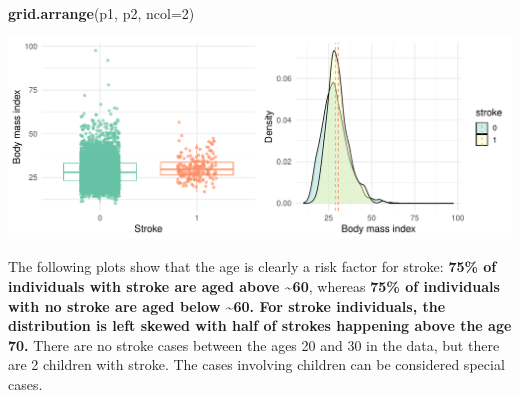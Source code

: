 \documentclass[
]{article}
\newenvironment{Shaded}{\begin{snugshade}}{\end{snugshade}}
\newcommand{\AttributeTok}[1]{\textcolor[rgb]{0.13,0.29,0.53}{#1}}
\newcommand{\DecValTok}[1]{\textcolor[rgb]{0.00,0.00,0.81}{#1}}
\newcommand{\FunctionTok}[1]{\textcolor[rgb]{0.13,0.29,0.53}{\textbf{#1}}}
\newcommand{\NormalTok}[1]{#1}
\begin{document}
\begin{Shaded}
\begin{Highlighting}[]
\FunctionTok{grid.arrange}\NormalTok{(p1, p2, }\AttributeTok{ncol=}\DecValTok{2}\NormalTok{)}
\end{Highlighting}
\end{Shaded}

\includegraphics{Build-deploy-stroke-prediction-model-R_files/figure-latex/bmi-stroke-hist-1.pdf}

The following plots show that the age is clearly a risk factor for
stroke: \textbf{75\% of individuals with stroke are aged above
\textasciitilde60}, whereas \textbf{75\% of individuals with no stroke
are aged below \textasciitilde60. For stroke individuals, the
distribution is left skewed with half of strokes happening above the age
70.} There are no stroke cases between the ages 20 and 30 in the data,
but there are 2 children with stroke. The cases involving children can
be considered special cases.
\end{document}
